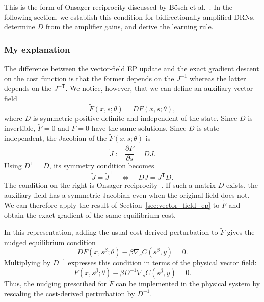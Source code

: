 \documentclass{article}
\begin{document}
This is the form of Onsager reciprocity discussed by
B\"osch et al.~\cite{bosch2026unifying}. 
In the following section, we establish this condition for bidirectionally
amplified DRNs, determine $D$ from the amplifier gains, and derive the learning rule.

\subsubsection{My explanation}
\label{sec:my_vector_field_explanation}

The difference between the vector-field EP update and the exact gradient descent
on the cost function is that the former depends on the $J^{-1}$ whereas the latter depends on the $J^{-\mathsf T}$. We notice, however, that we can
define an auxiliary vector field
\begin{equation}
\widetilde F(x,s;\theta)=DF(x,s;\theta),
\label{eq:my_explanation_auxiliary_field}
\end{equation}
where $D$ is symmetric positive definite and independent of the state. Since $D$ is invertible, $\widetilde F=0$ and
$F=0$ have the same solutions. 
Since $D$ is state-independent, the Jacobian of the $\widetilde F(x,s;\theta)$ is
\begin{equation}
\widetilde J
:=\frac{\partial\widetilde F}{\partial s}
=DJ.
\label{eq:my_explanation_auxiliary_jacobian}
\end{equation}
Using $D^{\mathsf T}=D$, its symmetry condition becomes
\begin{equation}
\widetilde J=\widetilde J^{\mathsf T}
\quad\Longleftrightarrow\quad
DJ=J^{\mathsf T}D.
\label{eq:my_explanation_reciprocity}
\end{equation}
The condition on the right is Onsager reciprocity~\cite{bosch2026unifying}.
If such a matrix $D$ exists, the auxiliary field has a symmetric Jacobian
even when the original field does not. We can therefore apply the result
of Section~\ref{sec:vector_field_ep} to $\widetilde F$ and obtain the exact
gradient of the same equilibrium cost.

In this representation, adding the usual cost-derived perturbation to
$\widetilde F$ gives the nudged equilibrium condition
\begin{equation}
DF(x,s^\beta;\theta)-\beta\nabla_s C(s^\beta,y)=0.
\label{eq:my_explanation_auxiliary_nudging}
\end{equation}
Multiplying by $D^{-1}$ expresses this condition in terms of the physical
vector field:
\begin{equation}
F(x,s^\beta;\theta)-\beta D^{-1}\nabla_s C(s^\beta,y)=0.
\label{eq:my_explanation_physical_nudging}
\end{equation}
Thus, the nudging prescribed for $\widetilde F$ can be implemented in the
physical system by rescaling the cost-derived perturbation by $D^{-1}$.
\end{document}
